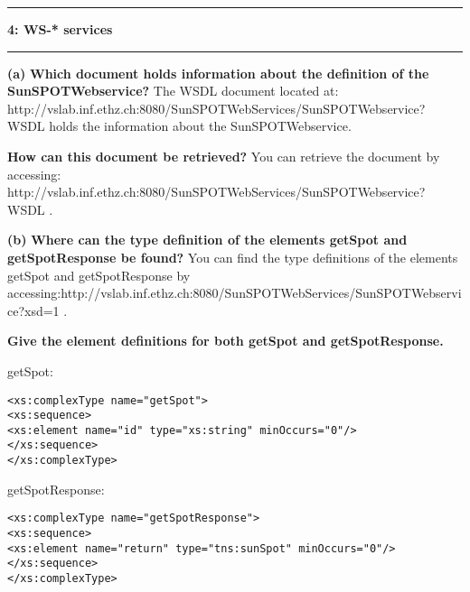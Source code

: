 \documentclass[11pt]{article}
\newcommand\question[2]{\vspace{.25in}\hrule\textbf{#1: #2}\vspace{.5em}\hrule\vspace{.10in}}
\renewcommand\part[1]{\vspace{.10in}\textbf{(#1)}}
\begin{document}
\raggedright

\newcommand\NAME{Lukas, Young, Vincent}  %

\question{4}{WS-* services} 
\part{a}  
\textbf{Which document holds information about the definition of the SunSPOTWebservice?}\newline
The WSDL document located at: \newline
http://vslab.inf.ethz.ch:8080/SunSPOTWebServices/SunSPOTWebservice?WSDL \newline
holds the information about the SunSPOTWebservice. \newline

\textbf{How can this document be retrieved?}\newline
You can retrieve the document by accessing: \newline
http://vslab.inf.ethz.ch:8080/SunSPOTWebServices/SunSPOTWebservice?WSDL .


\part{b} 
\textbf{Where can the type definition of the elements getSpot and getSpotResponse be found?}\newline
You can find the type definitions of the elements getSpot and getSpotResponse by accessing:\newline http://vslab.inf.ethz.ch:8080/SunSPOTWebServices/SunSPOTWebservice?xsd=1 .

\textbf{Give the element definitions for both getSpot and getSpotResponse.}\newline

getSpot: 
\begin{small}
\begin{lstlisting}[frame=single]
<xs:complexType name="getSpot">
<xs:sequence>
<xs:element name="id" type="xs:string" minOccurs="0"/>
</xs:sequence>
</xs:complexType>
\end{lstlisting}
\end{small}

getSpotResponse:
\begin{small}
\begin{lstlisting}[frame=single]
<xs:complexType name="getSpotResponse">
<xs:sequence>
<xs:element name="return" type="tns:sunSpot" minOccurs="0"/>
</xs:sequence>
</xs:complexType>
\end{lstlisting}
\end{small}
\end{document}

